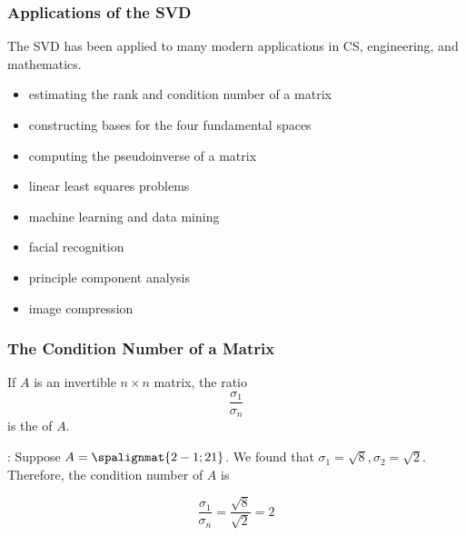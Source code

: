 \begin{frame} \frametitle{Applications of the SVD}

    The SVD has been applied to many modern applications in CS, engineering, and mathematics. %
    
    \begin{small}
    \begin{itemize}
        \item estimating the rank and condition number of a matrix
        \item constructing bases for the four fundamental spaces
        \item computing the pseudoinverse of a matrix
        \item linear least squares problems
        \item machine learning and data mining %
        \item facial recognition %
        \item principle component analysis %
        \item image compression
    \end{itemize}
    \end{small}
    
 
\end{frame}

\begin{frame} \frametitle{The Condition Number of a Matrix}

    If $A$ is an invertible $n\times n$ matrix, the ratio $$\frac{\sigma_1}{\sigma_n}$$ is the  of $A$.

    \vspace{12pt} 
    : Suppose $A = \spalignmat{2 -1;2 1}$. We found that $\sigma_1 = \sqrt8, \sigma_2 = \sqrt2$. \pause Therefore, the condition number of $A$ is
    
    $$\frac{\sigma_1}{\sigma_n} = \frac{\sqrt8}{\sqrt2}=2$$
    
\end{frame}

